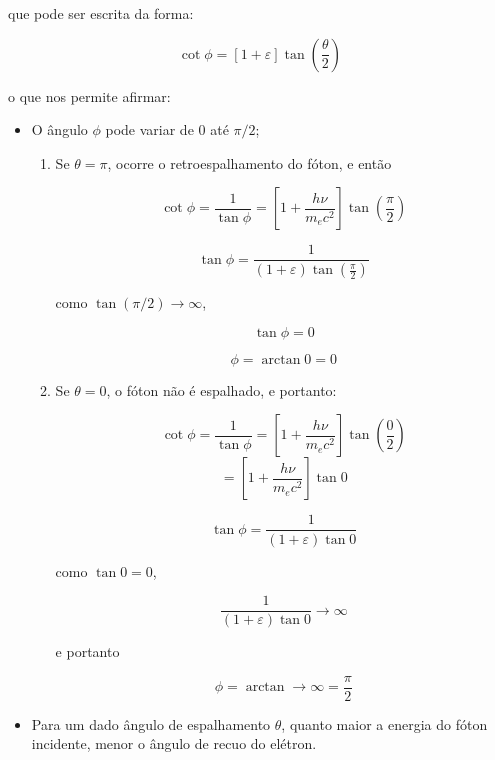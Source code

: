 \documentclass[11pt,a4paper]{article}
\begin{document}
            \noindent que pode ser escrita da forma:

                \begin{equation}
                    \cot \phi = \left[1 + \varepsilon  \right]\tan \left(\frac{\theta}{2}\right)
                \end{equation}

            \noindent o que nos permite afirmar:

                \begin{itemize}
                    \item  O ângulo $\phi$ pode variar de 0 até $\pi/2$;
                        \begin{enumerate}
                            \item Se $\theta = \pi$, ocorre o retroespalhamento do fóton, e então 
                            
                                $$\cot \phi = \frac{1}{\tan \phi} =  \left[1 + \frac{h\nu}{m_ec^2} \right]\tan \left(\frac{\pi}{2}\right) $$

                                $$\tan \phi = \frac{1}{(1 + \varepsilon ) \tan \left(\frac{\pi}{2}\right)}$$

                                \noindent como $\tan (\pi/2) \rightarrow \infty$,

                                $$\tan \phi = 0$$

                                $$\phi = \arctan 0 = 0$$

                            \item Se $\theta = 0$, o fóton não é espalhado, e portanto:
                            
                            $$\cot \phi = \frac{1}{\tan \phi} =  \left[1 + \frac{h\nu}{m_ec^2} \right]\tan \left(\frac{0}{2}\right) $$
                            $$=  \left[1 + \frac{h\nu}{m_ec^2} \right]\tan 0 $$

                            $$\tan \phi = \frac{1}{(1 + \varepsilon ) \tan 0}$$

                            \noindent como $\tan 0 = 0$, 

                            $$\frac{1}{(1 + \varepsilon ) \tan 0} \rightarrow \infty $$

                            \noindent e portanto 

                            $$\phi = \arctan \rightarrow \infty = \frac{\pi}{2} $$

                        \end{enumerate}
                    \item Para um dado ângulo de espalhamento $\theta$, quanto maior a energia do fóton incidente, menor o ângulo de recuo do elétron.
                \end{itemize}
\end{document}
